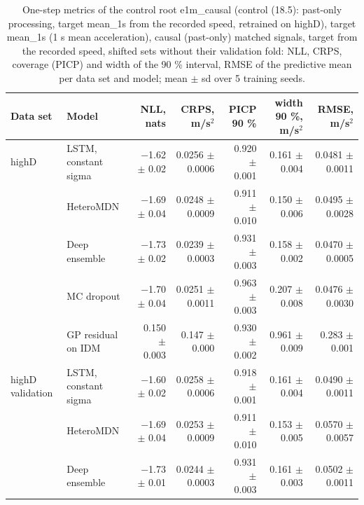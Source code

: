 \begin{table}[htbp]
\centering
\footnotesize
\caption{One-step metrics of the control root e1m\_causal (control (18.5): past-only processing, target mean\_1s from the recorded speed, retrained on highD), target mean\_1s (1 s mean acceleration), causal (past-only) matched signals, target from the recorded speed, shifted sets without their validation fold: NLL, CRPS, coverage (PICP) and width of the 90 \% interval, RMSE of the predictive mean per data set and model; mean $\pm$ sd over 5 training seeds.}
\label{tab:t1-one-step--matched-causal--mean-1s}
\begin{tabular}{llrrrrr}
\toprule
Data set & Model & NLL, nats & CRPS, m/s$^2$ & PICP 90 \% & width 90 \%, m/s$^2$ & RMSE, m/s$^2$ \\
\midrule
highD & LSTM, constant sigma & $-$1.62 $\pm$ 0.02 & 0.0256 $\pm$ 0.0006 & 0.920 $\pm$ 0.001 & 0.161 $\pm$ 0.004 & 0.0481 $\pm$ 0.0011 \\
 & HeteroMDN & $-$1.69 $\pm$ 0.04 & 0.0248 $\pm$ 0.0009 & 0.911 $\pm$ 0.010 & 0.150 $\pm$ 0.006 & 0.0495 $\pm$ 0.0028 \\
 & Deep ensemble & $-$1.73 $\pm$ 0.02 & 0.0239 $\pm$ 0.0003 & 0.931 $\pm$ 0.003 & 0.158 $\pm$ 0.002 & 0.0470 $\pm$ 0.0005 \\
 & MC dropout & $-$1.70 $\pm$ 0.04 & 0.0251 $\pm$ 0.0011 & 0.963 $\pm$ 0.003 & 0.207 $\pm$ 0.008 & 0.0476 $\pm$ 0.0030 \\
 & GP residual on IDM & 0.150 $\pm$ 0.003 & 0.147 $\pm$ 0.000 & 0.930 $\pm$ 0.002 & 0.961 $\pm$ 0.009 & 0.283 $\pm$ 0.001 \\
\midrule
highD validation & LSTM, constant sigma & $-$1.60 $\pm$ 0.02 & 0.0258 $\pm$ 0.0006 & 0.918 $\pm$ 0.001 & 0.161 $\pm$ 0.004 & 0.0490 $\pm$ 0.0011 \\
 & HeteroMDN & $-$1.69 $\pm$ 0.04 & 0.0253 $\pm$ 0.0009 & 0.911 $\pm$ 0.010 & 0.153 $\pm$ 0.005 & 0.0570 $\pm$ 0.0057 \\
 & Deep ensemble & $-$1.73 $\pm$ 0.01 & 0.0244 $\pm$ 0.0003 & 0.931 $\pm$ 0.003 & 0.161 $\pm$ 0.003 & 0.0502 $\pm$ 0.0011 \\

\end{tabular}
\end{table}
